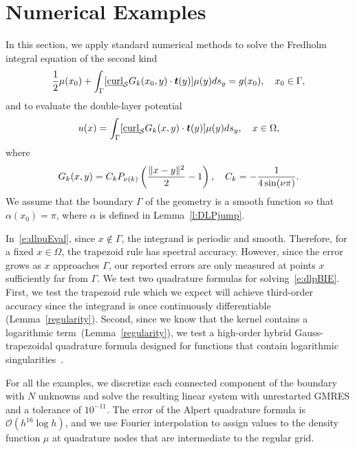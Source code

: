 \section{Numerical Examples}
\label{s:numerics}
In this section, we apply standard numerical methods to solve the
Fredholm integral equation of the second kind
\begin{align}
  \label{e:dlpBIE}
  \frac{1}{2}\mu(x_{0}) + \int_{\Gamma}
    [\underline{\mbox{curl}}_{\S}G_{k}(x_{0},y) \cdot
    \vec{t}(y)] \mu(y)ds_{y} = g(x_{0}), \quad x_{0} \in \Gamma,
\end{align}
and to evaluate the double-layer potential
\begin{align}
  \label{e:dlpuEval}
  u(x) = \int_{\Gamma} [\underline{\mbox{curl}}_{\S}G_{k}(x,y) 
    \cdot \vec{t}(y)] \mu(y)ds_{y}, \quad x \in \Omega,
\end{align}
where
\begin{align*}
  G_{k}(x,y) = C_k P_{\nu(k)} \left(
    \frac{\|x - y\|^{2}}{2} - 1\right), \quad 
  C_k=-\frac{1}{4\sin(\nu\pi)}.
\end{align*}
We assume that the boundary $\Gamma$ of the geometry is a smooth
function so that $\alpha(x_{0}) = \pi$, where $\alpha$ is defined in
Lemma~\ref{l:DLPjump}.

In~\eqref{e:dlpuEval}, since $x \notin \Gamma$, the integrand is
periodic and smooth.  Therefore, for a fixed $x\in \Omega$, the
trapezoid rule has spectral accuracy.  However, since the error grows as
$x$ approaches $\Gamma$, our reported errors are only measured at points
$x$ sufficiently far from $\Gamma$.  We test two quadrature formulas for
solving~\eqref{e:dlpBIE}.  First, we test the trapezoid rule which we
expect will achieve third-order accuracy since the integrand is once
continuously differentiable (Lemma~\ref{regularity}).  Second, since we
know that the kernel contains a logarithmic
term~(Lemma~\ref{regularity}), we test a high-order hybrid
Gauss-trapezoidal quadrature formula designed for functions that contain
logarithmic singularities~\cite{alpert}.

For all the examples, we discretize each connected component of the
boundary with $N$ unknowns and solve the resulting linear system with
unrestarted GMRES and a tolerance of $10^{-11}$.  The error of the
Alpert quadrature formula is $\mathcal{O}(h^{16}\log h)$, and we use
Fourier interpolation to assign values to the density function $\mu$ at
quadrature nodes that are intermediate to the regular grid.

